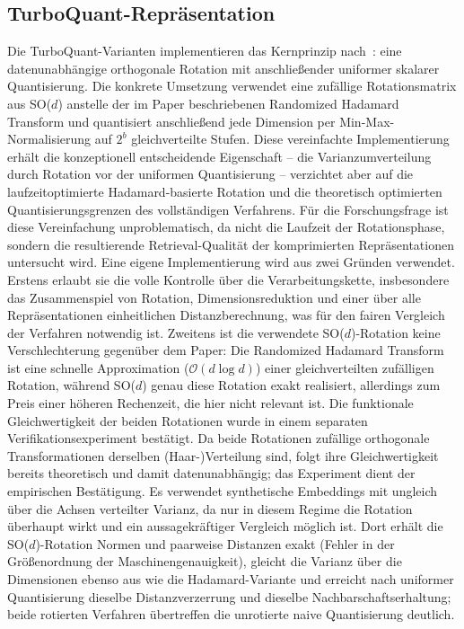 \subsection{TurboQuant-Repräsentation}
%
Die TurboQuant-Varianten implementieren das Kernprinzip nach~\cite{zandieh_2025_turboquant}: eine datenunabhängige orthogonale Rotation mit anschließender uniformer skalarer Quantisierung.
Die konkrete Umsetzung verwendet eine zufällige Rotationsmatrix aus SO($d$) anstelle der im Paper beschriebenen Randomized Hadamard Transform und quantisiert anschließend jede Dimension per Min-Max-Normalisierung auf $2^b$ gleichverteilte Stufen.
Diese vereinfachte Implementierung erhält die konzeptionell entscheidende Eigenschaft -- die Varianzumverteilung durch Rotation vor der uniformen Quantisierung -- verzichtet aber auf die laufzeitoptimierte Hadamard-basierte Rotation und die theoretisch optimierten Quantisierungsgrenzen des vollständigen Verfahrens.
Für die Forschungsfrage ist diese Vereinfachung unproblematisch, da nicht die Laufzeit der Rotationsphase, sondern die resultierende Retrieval-Qualität der komprimierten Repräsentationen untersucht wird.
%
Eine eigene Implementierung wird aus zwei Gründen verwendet.
Erstens erlaubt sie die volle Kontrolle über die Verarbeitungskette, insbesondere das Zusammenspiel von Rotation, Dimensionsreduktion und einer über alle Repräsentationen einheitlichen Distanzberechnung, was für den fairen Vergleich der Verfahren notwendig ist.
Zweitens ist die verwendete SO($d$)-Rotation keine Verschlechterung gegenüber dem Paper: Die Randomized Hadamard Transform ist eine schnelle Approximation ($\mathcal{O}(d \log d)$) einer gleichverteilten zufälligen Rotation, während SO($d$) genau diese Rotation exakt realisiert, allerdings zum Preis einer höheren Rechenzeit, die hier nicht relevant ist.
%
Die funktionale Gleichwertigkeit der beiden Rotationen wurde in einem separaten Verifikationsexperiment bestätigt.
Da beide Rotationen zufällige orthogonale Transformationen derselben (Haar-)Verteilung sind, folgt ihre Gleichwertigkeit bereits theoretisch und damit datenunabhängig; das Experiment dient der empirischen Bestätigung.
Es verwendet synthetische Embeddings mit ungleich über die Achsen verteilter Varianz, da nur in diesem Regime die Rotation überhaupt wirkt und ein aussagekräftiger Vergleich möglich ist.
Dort erhält die SO($d$)-Rotation Normen und paarweise Distanzen exakt (Fehler in der Größenordnung der Maschinengenauigkeit), gleicht die Varianz über die Dimensionen ebenso aus wie die Hadamard-Variante und erreicht nach uniformer Quantisierung dieselbe Distanzverzerrung und dieselbe Nachbarschaftserhaltung; beide rotierten Verfahren übertreffen die unrotierte naive Quantisierung deutlich.
